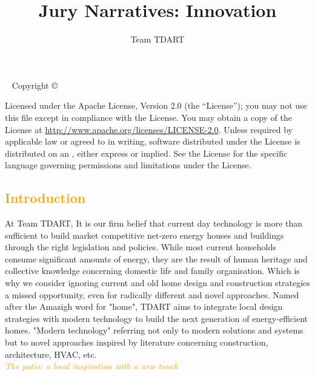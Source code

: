 \documentclass[justified]{tufte-book}
\author{Team TDART\hfill \usebox{\titleimage} }
\title[Jury Narratives]{Jury Narratives: Innovation}
\newcommand{\monthyear}{%
	\ifcase\month\or January\or February\or March\or April\or May\or June\or
	July\or August\or September\or October\or November\or
	December\fi\space\number\year
}
\begin{document}
	\frontmatter
	\maketitle
	\newpage
	\begin{fullwidth}
		~\vfill
		\thispagestyle{empty}
		\setlength{\parindent}{0pt}
		\setlength{\parskip}{\baselineskip}
		Copyright \copyright\ \the\year\ \thanklessauthor
		
		\par{}
		
		
		\par Licensed under the Apache License, Version 2.0 (the ``License''); you may not
		use this file except in compliance with the License. You may obtain a copy
		of the License at \url{http://www.apache.org/licenses/LICENSE-2.0}. Unless
		required by applicable law or agreed to in writing, software distributed
		under the License is distributed on an , either express or implied. See the
		License for the specific language governing permissions and limitations
		under the License.
		
	\end{fullwidth}
	
	
	\textcolor{orange}{\chapter*{Introduction}}
	At Team TDART, It is our firm belief that current day technology is more than sufficient to build market competitive net-zero energy houses and buildings through the right legislation and policies. While most current households consume significant amounts of energy, they are the result of human heritage and collective knowledge concerning domestic life and family organisation. Which is why we consider ignoring current and old home design and construction strategies a missed opportunity, even for radically different and novel approaches. Named after the Amazigh word for "home", TDART aims to integrate local design strategies with modern technology to build the next generation of energy-efficient homes. "Modern technology" referring not only to modern solutions and systems but to novel approaches inspired by literature concerning construction, architecture, HVAC, etc. 
	\vspace*{2cm}\\
	\textcolor{orange}{\textit{\Huge{The patio: a local inspiration with a new touch}}}
	\vspace*{2cm}\\
\end{document}
